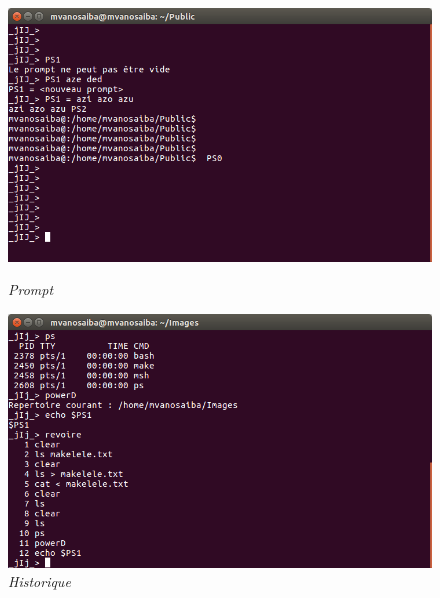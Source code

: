 \begin{figure}[h!]
\begin{center}
\centering \includegraphics[scale=0.40]{figure/prompt.png}
\caption{\it Prompt}

\centering \includegraphics[scale=0.40]{figure/histo.png}
\caption{\it Historique}

\end{center}
\end{figure}

